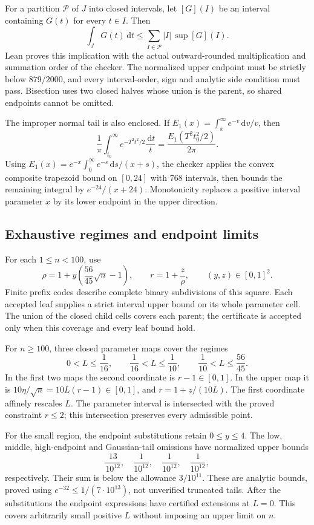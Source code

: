 \documentclass[11pt]{article}
\newcommand{\dd}{\,\mathrm d}
\begin{document}
For a partition \(\mathcal P\) of \(J\) into closed intervals, let
\([G](I)\) be an interval containing \(G(t)\) for every \(t\in I\).
Then
\[
 \int_J G(t)\dd t
 \le\sum_{I\in\mathcal P}|I|\,\sup[G](I).
\]
Lean proves this implication with the actual outward-rounded
multiplication and summation order of the checker. The normalized
upper endpoint must be strictly below \(879/2000\), and every
interval-order, sign and analytic side condition must pass. Bisection
uses two closed halves whose union is the parent, so shared endpoints
cannot be omitted.

The improper normal tail is also enclosed. If
\(E_1(x)=\int_x^\infty e^{-v}\dd v/v\), then
\[
 \frac1\pi\int_{t_0}^\infty e^{-T^2t^2/2}\frac{\dd t}{t}
 =\frac{E_1(T^2t_0^2/2)}{2\pi}.
\]
Using \(E_1(x)=e^{-x}\int_0^\infty e^{-s}\dd s/(x+s)\),
the checker applies the convex composite trapezoid bound on
\([0,24]\) with 768 intervals, then bounds the remaining integral by
\(e^{-24}/(x+24)\). Monotonicity replaces a positive interval
parameter \(x\) by its lower endpoint in the upper direction.

\subsection{Exhaustive regimes and endpoint limits}

For each \(1\le n<100\), use
\[
 \rho=1+y\left(\frac{56}{45}\sqrt n-1\right),\qquad
 r=1+\frac z\rho,\qquad (y,z)\in[0,1]^2.
\]
Finite prefix codes describe complete binary subdivisions of this square.
Each accepted leaf supplies a strict interval upper bound on its whole
parameter cell. The union of the closed child cells covers each parent;
the certificate is accepted only when this coverage and every leaf bound hold.

For \(n\ge100\), three closed parameter maps cover the regimes
\[
 0<L\le\frac1{16},\qquad
 \frac1{16}<L\le\frac1{10},\qquad
 \frac1{10}<L\le\frac{56}{45}.
\]
In the first two maps the second coordinate is \(r-1\in[0,1]\).
In the upper map it is \(10\eta/\sqrt n=10L(r-1)\in[0,1]\),
and \(r=1+z/(10L)\). The first coordinate affinely rescales \(L\).
The parameter interval is intersected with the proved constraint
\(r\le2\); this intersection preserves every admissible point.

For the small region, the endpoint substitutions retain \(0\le y\le4\).
The low, middle, high-endpoint and Gaussian-tail omissions have
normalized upper bounds
\[
 \frac{13}{10^{12}},\quad \frac1{10^{12}},\quad
 \frac1{10^{12}},\quad \frac1{10^{12}},
\]
respectively. Their sum is below the allowance \(3/10^{11}\).
These are analytic bounds, proved using
\(e^{-32}\le1/(7\cdot10^{13})\), not unverified truncated tails.
After the substitutions the endpoint expressions have certified
extensions at \(L=0\). This covers arbitrarily small positive \(L\)
without imposing an upper limit on \(n\).
\end{document}
